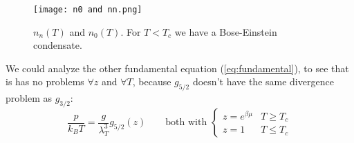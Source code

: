 \begin{figure}[ht]
    \centering
    \texttt{[image: n0 and nn.png]}
    \caption{$n_n(T)$ and $n_0(T)$. For $T < T_c$ we have a Bose-Einstein condensate.}
    \label{fig:n0-nn}
\end{figure}

We could analyze the other fundamental equation (\ref{eq:fundamental}), to see that is has no problems $\forall z$ and $\forall T$, because $g_{5/2}$ doesn't have the same divergence problem as $g_{3/2}$:
$$
    \frac p{k_BT} = \frac g{\lambda_T^3} g_{5/2}(z) \qquad \text{both with } \begin{cases}
        z= e^{\beta\mu} & T\ge T_c\\ z=1 & T \le T_c
    \end{cases} 
$$

